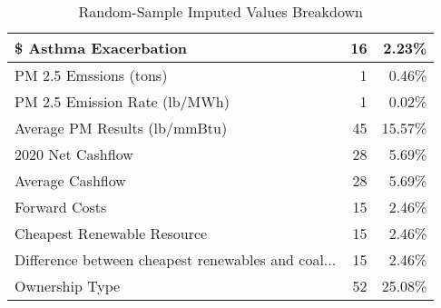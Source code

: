 \begin{table}[H]
\begin{adjustbox}{width=\textwidth}
\begin{tabular}{|l | r | r |}
        \$ Asthma Exacerbation                              &              16 &            2.23\% \\ \midrule
        PM 2.5 Emssions (tons)                             &               1 &            0.46\% \\ \midrule
        PM 2.5 Emission Rate (lb/MWh)                      &               1 &            0.02\% \\ \midrule
        Average PM Results (lb/mmBtu)                      &              45 &            15.57\% \\ \midrule
        2020 Net Cashflow                                  &              28 &            5.69\% \\ \midrule
        Average Cashflow                                   &              28 &            5.69\% \\ \midrule
        Forward Costs                                      &              15 &            2.46\% \\ \midrule
        Cheapest Renewable Resource                        &              15 &            2.46\% \\ \midrule
        Difference between cheapest renewables and coal... &              15 &            2.46\% \\ \midrule
        Ownership Type                                     &              52 &            25.08\% \\ \bottomrule
        \end{tabular}
    \end{adjustbox}
    \caption{Random-Sample Imputed Values Breakdown}
\end{table}


